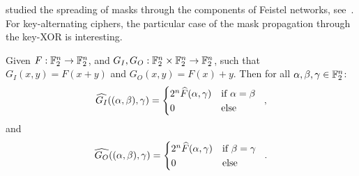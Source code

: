 \citeauthor{EC:Matsui94} studied the spreading of masks through the components of Feistel networks, see~\cite[Section~3 and Fig.~3]{EC:Matsui94}.
For key-alternating ciphers, the particular case of the mask propagation through the key-XOR is interesting.
\begin{lemma}\label{lem:comp-xor}
    Given $F : \mathbb{F}_2^n \to \mathbb{F}_2^n$, and $G_I, G_O : \mathbb{F}_2^n \times \mathbb{F}_2^n \to \mathbb{F}_2^n$, such that $G_I(x, y) = F(x + y)$ and $G_O(x, y) = F(x) + y$.
    Then for all $\alpha, \beta, \gamma \in \mathbb{F}_2^n$:
    \begin{equation*}
        \FC{G_I}((\alpha, \beta), \gamma) = \begin{cases*}
            2^n \FC{F}(\alpha, \gamma) & if $\alpha = \beta$ \\
            0                          & else
        \end{cases*}\;,
    \end{equation*}
    and
    \begin{equation*}
        \FC{G_O}((\alpha, \beta), \gamma) = \begin{cases*}
            2^n \FC{F}(\alpha, \gamma) & if $\beta = \gamma$ \\
            0                          & else
        \end{cases*}\;.
    \end{equation*}
\end{lemma}
